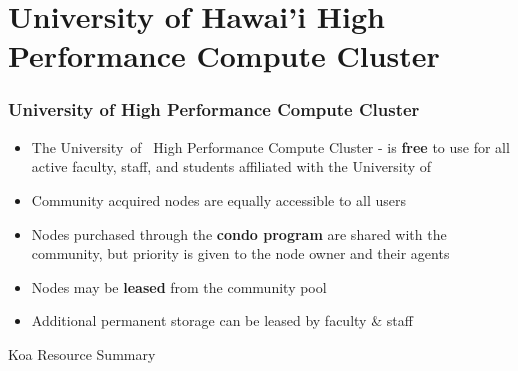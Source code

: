\section[University of Hawai'i High Performance Compute Cluster]{University of Hawai'i High Performance Compute Cluster}
\begin{frame}
    \frametitle{University of {\hawaii} High Performance Compute Cluster}
    \begin{itemize}
    \item The University~of~{\hawaii} High Performance Compute Cluster - \textbf{\mana} is \textbf{free} to use for all active faculty, staff, and students affiliated with the University of {\hawaii}
    \item Community acquired nodes are equally accessible to all users
    \item Nodes purchased through the {\textbf{condo program}} are shared with the community, but priority is given to the node owner and their agents
		\item Nodes may be {\textbf{leased}} from the community pool
		\item Additional permanent storage can be leased by faculty \& staff
    \end{itemize}
		\begin{block}{Koa Resource Summary}
  \begin{table}
    \centering
  \end{table}
	\end{block}
\end{frame}



